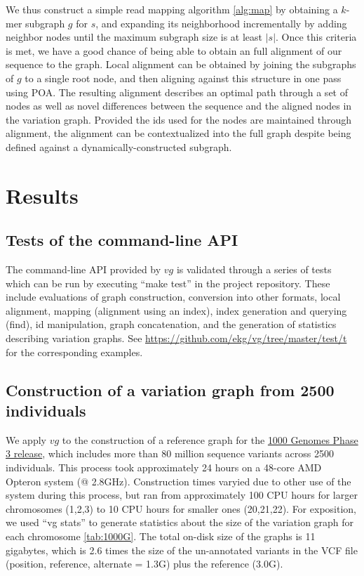 \documentclass{article}
\begin{document}
We thus construct a simple read mapping algorithm \ref{alg:map} by obtaining a $k$-mer subgraph $g$ for $s$, and expanding its neighborhood incrementally by adding neighbor nodes until the maximum subgraph size is at least $|s|$. Once this criteria is met, we have a good chance of being able to obtain an full alignment of our sequence to the graph. Local alignment can be obtained by joining the subgraphs of $g$ to a single root node, and then aligning against this structure in one pass using POA. The resulting alignment describes an optimal path through a set of nodes as well as novel differences between the sequence and the aligned nodes in the variation graph. Provided the ids used for the nodes are maintained through alignment, the alignment can be contextualized into the full graph despite being defined against a dynamically-constructed subgraph.


\section{Results}

\subsection{Tests of the command-line API}

The command-line API provided by $vg$ is validated through a series of tests which can be run by executing ``make test'' in the project repository. These include evaluations of graph construction, conversion into other formats, local alignment, mapping (alignment using an index), index generation and querying (find), id manipulation, graph concatenation, and the generation of statistics describing variation graphs. See \url{https://github.com/ekg/vg/tree/master/test/t} for the corresponding examples.

\subsection{Construction of a variation graph from 2500 individuals}

We apply $vg$ to the construction of a reference graph for the \href{http://www.1000genomes.org/announcements/phase3-variant-calls-chry-are-available-variant-calls-chrx-have-been-updated-2014-11-0}{1000 Genomes Phase 3 release}, which includes more than 80 million sequence variants across 2500 individuals. This process took approximately 24 hours on a 48-core AMD Opteron system (@ 2.8GHz). Construction times varyied due to other use of the system during this process, but ran from approximately 100 CPU hours for larger chromosomes (1,2,3) to 10 CPU hours for smaller ones (20,21,22). For exposition, we used ``vg stats'' to generate statistics about the size of the variation graph for each chromosome \ref{tab:1000G}. The total on-disk size of the graphs is 11 gigabytes, which is 2.6 times the size of the un-annotated variants in the VCF file (position, reference, alternate = 1.3G) plus the reference (3.0G).
\end{document}
